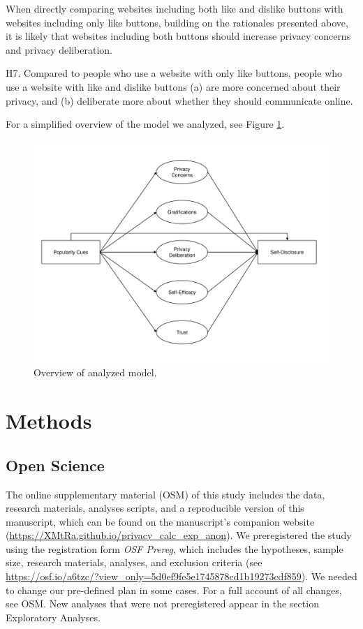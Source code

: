 \documentclass[
  english,
  man,floatsintext]{apa6}
\begin{document}
When directly comparing websites including both like and dislike buttons with websites including only like buttons, building on the rationales presented above, it is likely that websites including both buttons should increase privacy concerns and privacy deliberation.

H7. Compared to people who use a website with only like buttons, people who use a website with like and dislike buttons (a) are more concerned about their privacy, and (b) deliberate more about whether they should communicate online.

For a simplified overview of the model we analyzed, see Figure \ref{fig:model}.

\begin{figure}

{\centering \includegraphics[width=.8\textwidth]{figures/design/model} 

}

\caption{Overview of analyzed model.}\label{fig:model}
\end{figure}

\hypertarget{methods}{%
\section{Methods}\label{methods}}

\hypertarget{open-science}{%
\subsection{Open Science}\label{open-science}}

The online supplementary material (OSM) of this study includes the data, research materials, analyses scripts, and a reproducible version of this manuscript, which can be found on the manuscript's companion website (\url{https://XMtRa.github.io/privacy_calc_exp_anon}).
We preregistered the study using the registration form \emph{OSF Prereg}, which includes the hypotheses, sample size, research materials, analyses, and exclusion criteria (see \url{https://osf.io/a6tzc/?view_only=5d0ef9fe5e1745878cd1b19273cdf859}).
We needed to change our pre-defined plan in some cases.
For a full account of all changes, see OSM.
New analyses that were not preregistered appear in the section Exploratory Analyses.
\end{document}
